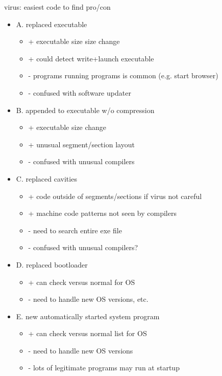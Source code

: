 \begin{frame}{virus: easiest code to find pro/con}
    \begin{itemize}
    \item A. replaced executable
        \begin{itemize}
        \item + executable size size change
        \item + could detect write+launch executable
        \item - programs running programs is common (e.g. start browser)
        \item - confused with software updater
        \end{itemize}
    \item B. appended to executable w/o compression
        \begin{itemize}
        \item + executable size change
        \item + unusual segment/section layout
        \item - confused with unusual compilers
        \end{itemize}
    \item C. replaced cavities
        \begin{itemize}
        \item + code outside of segments/sections if virus not careful
        \item + machine code patterns not seen by compilers
        \item - need to search entire exe file
        \item - confused with unusual compilers?
        \end{itemize}
    \item D. replaced bootloader
        \begin{itemize}
        \item + can check versus normal for OS
        \item - need to handle new OS versions, etc.
        \end{itemize}
    \item E. new automatically started system program
        \begin{itemize}
        \item + can check versus normal list for OS
        \item - need to handle new OS versions
        \item - lots of legitimate programs may run at startup
        \end{itemize}
    \end{itemize}
\end{frame}
